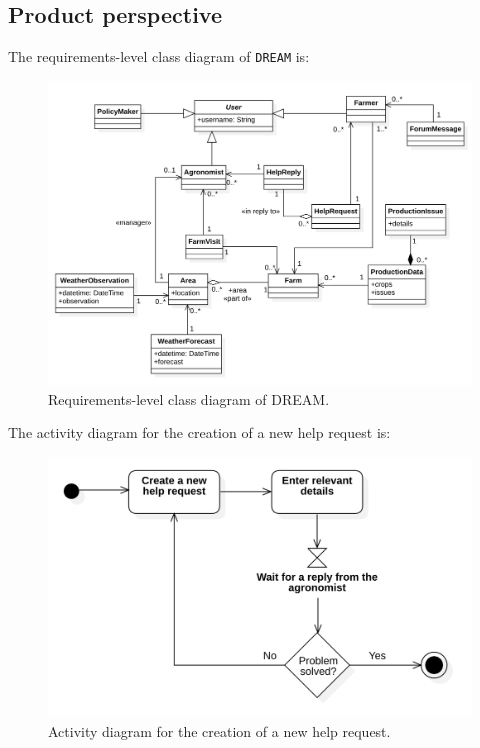 \documentclass{article}
\begin{document}
\subsection{Product perspective}
The requirements-level class diagram of \verb|DREAM| is:
\begin{figure}[H]
    \centering
	\includegraphics[scale=0.35]{class_diagrams/requirements-level class diagram.png}
    \caption{Requirements-level class diagram of DREAM.}
\end{figure}

The activity diagram for the creation of a new help request is:
\begin{figure}[H]
    \centering
	\includegraphics[scale=0.35]{state_machine_diagrams/statediagram1.png}
    \caption{Activity diagram for the creation of a new help request.}
\end{figure}
\end{document}

